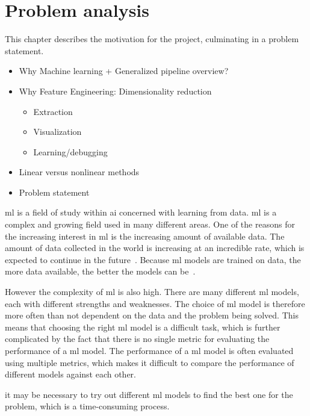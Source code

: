 \chapter{Problem analysis}\label{cha:problem-analysis}
This chapter describes the motivation for the project, culminating in a problem statement.

\begin{itemize}
    \item Why Machine learning + Generalized pipeline overview?
    \item Why Feature Engineering: Dimensionality reduction
          \begin{itemize}
              \item Extraction
              \item Visualization
              \item Learning/debugging
          \end{itemize}
    \item Linear versus nonlinear methods
    \item Problem statement
\end{itemize}

\gls{ml} is a field of study within \gls{ai} concerned with learning from data. \gls{ml} is a complex and growing field used in many different areas. One of the reasons for the increasing interest in \gls{ml} is the increasing amount of available data. The amount of data collected in the world is increasing at an incredible rate, which is expected to continue in the future~\cite{data-never-sleeps}. Because \gls{ml} models are trained on data, the more data available, the better the models can be~\cite{Unreasonable-effectiveness-of-data-Norvig}.

However the complexity of \gls{ml} is also high. There are many different \gls{ml} models, each with different strengths and weaknesses. The choice of \gls{ml} model is therefore more often than not dependent on the data and the problem being solved. This means that choosing the right \gls{ml} model is a difficult task, which is further complicated by the fact that there is no single metric for evaluating the performance of a \gls{ml} model. The performance of a \gls{ml} model is often evaluated using multiple metrics, which makes it difficult to compare the performance of different models against each other.

it may be necessary to try out different \gls{ml} models to find the best one for the problem, which is a time-consuming process.



